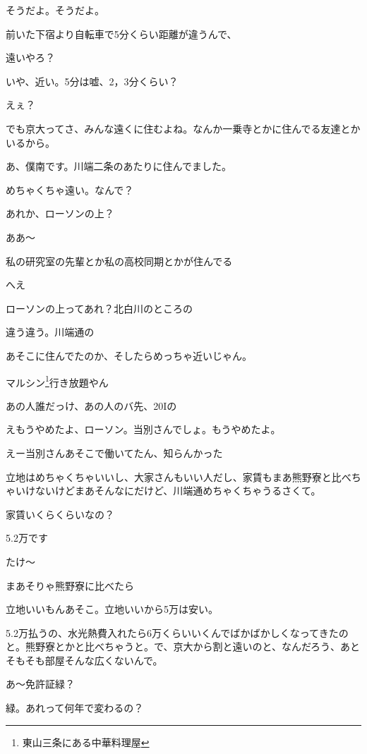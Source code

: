 \begin{multicols}{3}
そうだよ。そうだよ。

前いた下宿より自転車で5分くらい距離が違うんで、

遠いやろ？

いや、近い。5分は嘘、2，3分くらい？

えぇ？

でも京大ってさ、みんな遠くに住むよね。なんか一乗寺とかに住んでる友達とかいるから。

あ、僕南です。川端二条のあたりに住んでました。

めちゃくちゃ遠い。なんで？

あれか、ローソンの上？

ああ～

私の研究室の先輩とか私の高校同期とかが住んでる

へえ

ローソンの上ってあれ？北白川のところの

違う違う。川端通の

あそこに住んでたのか、そしたらめっちゃ近いじゃん。

マルシン\footnote{東山三条にある中華料理屋}行き放題やん

あの人誰だっけ、あの人のバ先、20Iの

えもうやめたよ、ローソン。当別さんでしょ。もうやめたよ。

えー当別さんあそこで働いてたん、知らんかった

立地はめちゃくちゃいいし、大家さんもいい人だし、家賃もまあ熊野寮と比べちゃいけないけどまあそんなにだけど、川端通めちゃくちゃうるさくて。

家賃いくらくらいなの？

5.2万です

たけ～

まあそりゃ熊野寮に比べたら

立地いいもんあそこ。立地いいから5万は安い。

5.2万払うの、水光熱費入れたら6万くらいいくんでばかばかしくなってきたのと。熊野寮とかと比べちゃうと。で、京大から割と遠いのと、なんだろう、あとそもそも部屋そんな広くないんで。

あ～免許証緑？

緑。あれって何年で変わるの？


\end{multicols}
